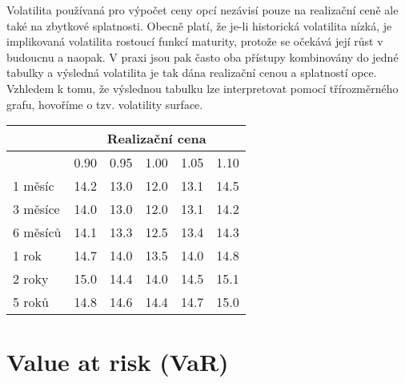 \documentclass[a4paper]{book}
\begin{document}
Volatilita používaná pro výpočet ceny opcí nezávisí pouze na realizační ceně ale také na zbytkové splatnosti. Obecně platí, že je-li historická volatilita nízká, je implikovaná volatilita rostoucí funkcí maturity, protože se očekává její růst v budoucnu a naopak.
V praxi jsou pak často oba přístupy kombinovány do jedné tabulky a výsledná volatilita je tak dána realizační cenou a splatností opce. Vzhledem k tomu, že výslednou tabulku lze interpretovat pomocí třírozměrného grafu, hovoříme o tzv. volatility surface.
\begin{center}
\begin{tabular}{l r r r r r}
\textbf{} &
\multicolumn {5}{c}{\textbf{Realizační cena}}\\
\hline
\textbf{} &
\multicolumn {1}{c}{0.90} &
\multicolumn {1}{c}{0.95} &
\multicolumn {1}{c}{1.00} &
\multicolumn {1}{c}{1.05} &
\multicolumn {1}{c}{1.10}\\
\hline
 1 měsíc  & 14.2 & 13.0 & 12.0 & 13.1 & 14.5 \\
 3 měsíce & 14.0 & 13.0 & 12.0 & 13.1 & 14.2 \\
 6 měsíců & 14.1 & 13.3 & 12.5 & 13.4 & 14.3 \\
 1 rok    & 14.7 & 14.0 & 13.5 & 14.0 & 14.8 \\
 2 roky   & 15.0 & 14.4 & 14.0 & 14.5 & 15.1 \\
 5 roků   & 14.8 & 14.6 & 14.4 & 14.7 & 15.0 \\
\hline 
\end{tabular}
\end{center}

\chapter{Value at risk (VaR)}
\end{document}
